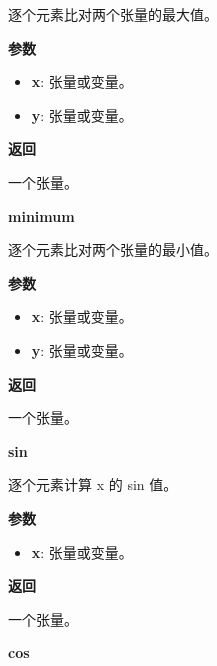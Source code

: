 逐个元素比对两个张量的最大值。

\textbf{参数}

\begin{itemize}
\tightlist
\item
  \textbf{x}: 张量或变量。
\item
  \textbf{y}: 张量或变量。
\end{itemize}

\textbf{返回}

一个张量。

\textbf{minimum}\label{minimum}

\begin{Shaded}
\begin{Highlighting}[]
\end{Highlighting}
\end{Shaded}

逐个元素比对两个张量的最小值。

\textbf{参数}

\begin{itemize}
\tightlist
\item
  \textbf{x}: 张量或变量。
\item
  \textbf{y}: 张量或变量。
\end{itemize}

\textbf{返回}

一个张量。


\textbf{sin}\label{sin}

\begin{Shaded}
\begin{Highlighting}[]
\end{Highlighting}
\end{Shaded}

逐个元素计算 x 的 sin 值。

\textbf{参数}

\begin{itemize}
\tightlist
\item
  \textbf{x}: 张量或变量。
\end{itemize}

\textbf{返回}

一个张量。


\textbf{cos}\label{cos}

\begin{Shaded}
\begin{Highlighting}[]
\end{Highlighting}
\end{Shaded}

